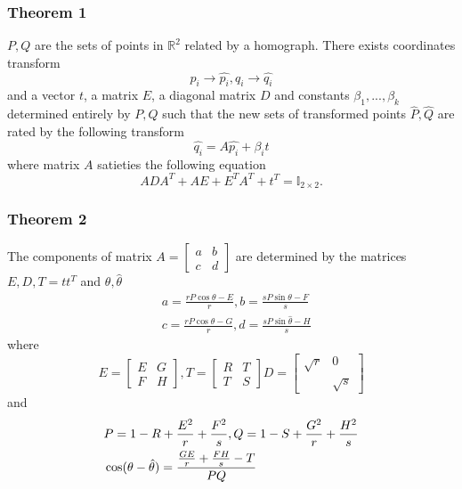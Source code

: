 \documentclass{beamer}
\begin{document}
\begin{frame}
\frametitle{Theorem 1}
$P,Q$ are the sets of points in $\mathbb{R}^2$ related by a homograph. There exists coordinates transform
\begin{equation}
p_i \to \hat{p_i}, q_i \to \hat{q_i}
\end{equation}
and a vector $t$, a matrix $E$, a diagonal matrix $D$ and constants $\beta_1,...,\beta_k$ determined entirely by $P,Q$ such that the new sets of transformed points $\hat{P},\hat{Q}$
are rated by the following transform
\begin{equation}
\hat{q_i} = A\hat{p_i} + \beta_i t
\end{equation}
where matrix $A$ satieties the following equation
\begin{equation}
ADA^T + AE + E^TA^T + t^T = \mathbb{I}_{2\times2}.
\end{equation}
\end{frame}

\begin{frame}
\frametitle{Theorem 2}
\small
The components of matrix $A = \begin{bmatrix} a & b \\ c & d\end{bmatrix}$ are determined by the matrices $E,D,T=tt^T$ and $\theta, \hat{\theta}$
\begin{equation}
\begin{split}
& a = \frac{rP\cos\theta - E}{r}, b = \frac{sP\sin\theta - F}{s}\\
& c = \frac{rP\cos\hat{\theta} - G}{r}, d = \frac{sP\sin\hat{\theta} - H}{s}
\end{split}
\end{equation}
where 
\begin{equation}
E = 
\begin{bmatrix} 
E & G \\ F & H
\end{bmatrix},
T = 
\begin{bmatrix} 
R & T \\ T & S
\end{bmatrix}
D = 
\begin{bmatrix} 
\sqrt{r} & 0 \\  & \sqrt{s}
\end{bmatrix}
\end{equation}
and 
\begin{equation}
\begin{split}
& P = 1 - R + {E^2 \over r} + {F^2 \over s},
Q = 1 - S + {G^2 \over r} + {H^2 \over s} \\
& \cos(\theta-\hat{\theta}) =  \frac{{GE \over r} + {FH \over s} - T}{PQ}
\end{split}
\end{equation}

\end{frame}
\end{document}
